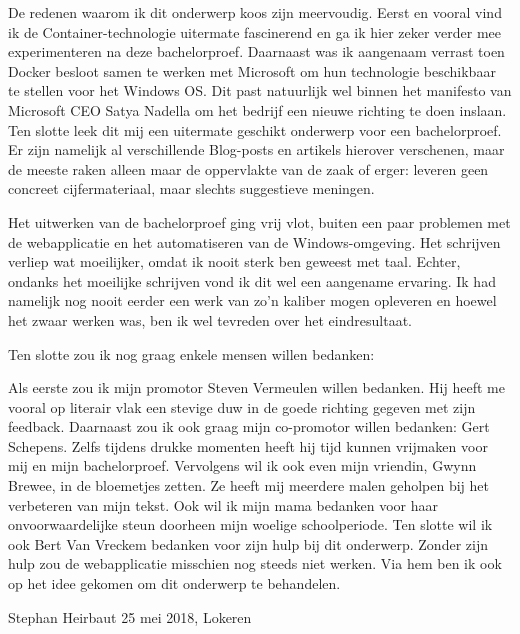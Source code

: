De redenen waarom ik dit onderwerp koos zijn meervoudig. Eerst en vooral vind ik de Container-technologie uitermate fascinerend en ga ik hier zeker verder mee experimenteren na deze bachelorproef. Daarnaast was ik aangenaam verrast toen Docker besloot samen te werken met Microsoft om hun technologie beschikbaar te stellen voor het Windows OS. Dit past natuurlijk wel binnen het manifesto van Microsoft CEO Satya Nadella om het bedrijf een nieuwe richting te doen inslaan. Ten slotte leek dit mij een uitermate geschikt onderwerp voor een bachelorproef. Er zijn namelijk al verschillende Blog-posts en artikels hierover verschenen, maar de meeste raken alleen maar de oppervlakte van de zaak of erger: leveren geen concreet cijfermateriaal, maar slechts suggestieve meningen.

Het uitwerken van de bachelorproef ging vrij vlot, buiten een paar problemen met de webapplicatie en het automatiseren van de Windows-omgeving. Het schrijven verliep wat moeilijker, omdat ik nooit sterk ben geweest met taal. Echter, ondanks het moeilijke schrijven vond ik dit wel een aangename ervaring. Ik had namelijk nog nooit eerder een werk van zo'n kaliber mogen opleveren en hoewel het zwaar werken was, ben ik wel tevreden over het eindresultaat.

Ten slotte zou ik nog graag enkele mensen willen bedanken:

Als eerste zou ik mijn promotor Steven Vermeulen willen bedanken. Hij heeft me vooral op literair vlak een stevige duw in de goede richting gegeven met zijn feedback. Daarnaast zou ik ook graag mijn co-promotor willen bedanken: Gert Schepens. Zelfs tijdens drukke momenten heeft hij tijd kunnen vrijmaken voor mij en mijn bachelorproef. Vervolgens wil ik ook even mijn vriendin, Gwynn Brewee, in de bloemetjes zetten. Ze heeft mij meerdere malen geholpen bij het verbeteren van mijn tekst. Ook wil ik mijn mama bedanken voor haar onvoorwaardelijke steun doorheen mijn woelige schoolperiode. Ten slotte wil ik ook Bert Van Vreckem bedanken voor zijn hulp bij dit onderwerp. Zonder zijn hulp zou de webapplicatie misschien nog steeds niet werken. Via hem ben ik ook op het idee gekomen om dit onderwerp te behandelen.

Stephan Heirbaut
25 mei 2018, Lokeren